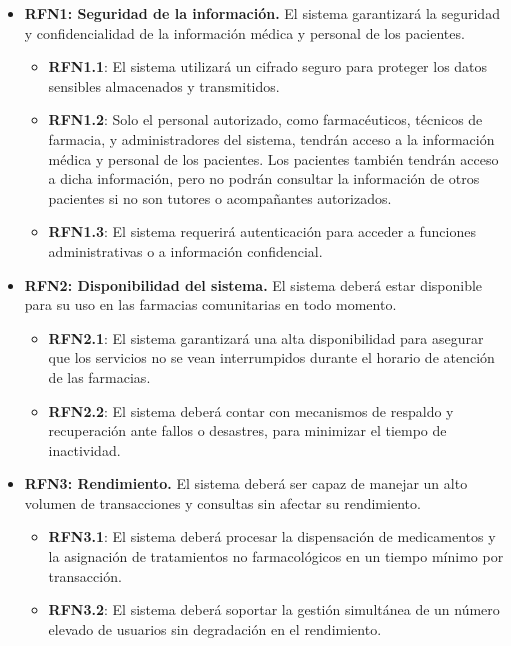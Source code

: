 \begin{itemize}
	\item \textbf{RFN1: Seguridad de la información.} El sistema garantizará la seguridad y confidencialidad de la información médica y personal de los pacientes.
	
	\begin{itemize}
		\item \textbf{RFN1.1}: El sistema utilizará un cifrado seguro para proteger los datos sensibles almacenados y transmitidos.
		\item \textbf{RFN1.2}: Solo el personal autorizado, como farmacéuticos, técnicos de farmacia, y administradores del sistema, tendrán acceso a la información médica y personal de los pacientes. Los pacientes también tendrán acceso a dicha información, pero no podrán consultar la información de otros pacientes si no son tutores o acompañantes autorizados.
		\item \textbf{RFN1.3}: El sistema requerirá autenticación para acceder a funciones administrativas o a información confidencial.
	\end{itemize}
	
	\item \textbf{RFN2: Disponibilidad del sistema.} El sistema deberá estar disponible para su uso en las farmacias comunitarias en todo momento.
	
	\begin{itemize}
		\item \textbf{RFN2.1}: El sistema garantizará una alta disponibilidad para asegurar que los servicios no se vean interrumpidos durante el horario de atención de las farmacias.
		\item \textbf{RFN2.2}: El sistema deberá contar con mecanismos de respaldo y recuperación ante fallos o desastres, para minimizar el tiempo de inactividad.
	\end{itemize}
	
	\item \textbf{RFN3: Rendimiento.} El sistema deberá ser capaz de manejar un alto volumen de transacciones y consultas sin afectar su rendimiento.
	
	\begin{itemize}
		\item \textbf{RFN3.1}: El sistema deberá procesar la dispensación de medicamentos y la asignación de tratamientos no farmacológicos en un tiempo mínimo por transacción.
		\item \textbf{RFN3.2}: El sistema deberá soportar la gestión simultánea de un número elevado de usuarios sin degradación en el rendimiento.
	\end{itemize}
	

\end{itemize}

